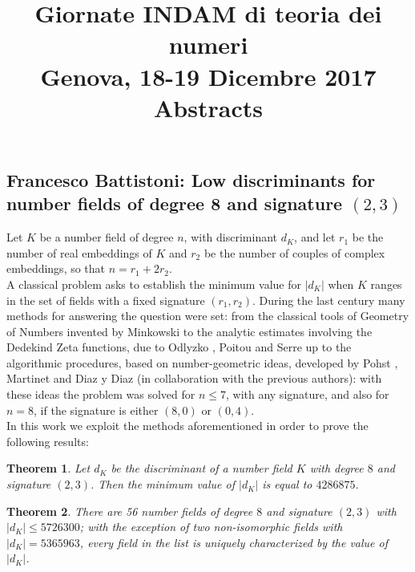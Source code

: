 \documentclass[15pt]{article}
\title{Giornate INDAM di teoria dei numeri\\ {\large Genova, 18-19 Dicembre 2017}\\[1em] Abstracts}
\author{}
\date{}
\newtheorem{thm}{Theorem}
\begin{document}
\maketitle
\thispagestyle{empty}

\vspace{-5em}

\subsection*{Francesco Battistoni: Low discriminants for number fields of degree 8 and signature $(2,3)$}
Let $K$ be a number field of degree $n$, with discriminant $d_K$, and let $r_1$ be the number of real embeddings of $K$ and $r_2$ be the number of couples of complex embeddings, so that $n=r_1+2r_2$.\\
A classical problem asks to establish the minimum value for $|d_K|$ when $K$ ranges in the set of fields with a fixed signature $(r_1,r_2)$. During the last century many methods for answering the question were set: from the classical tools of Geometry of Numbers invented by Minkowski to the analytic estimates involving the Dedekind Zeta functions, due to Odlyzko \cite{odlyzko1990bounds}, Poitou \cite{poitou1977petits} and Serre \cite{serre1986minorations} up to the algorithmic procedures, based on number-geometric ideas, developed by Pohst \cite{pohst1982computation}, Martinet \cite{martinet1985methodes} and Diaz y Diaz \cite{pohst1990minimum} (in collaboration with the previous authors): with these ideas the problem was solved for $n\leq 7$, with any signature, and also for $n=8$, if the signature is either $(8,0)$ or $(0,4)$.
\\
In this work we exploit the methods aforementioned in order to prove the following results:
\begin{thm}\label{minimumdisc}
	Let $d_K$ be the discriminant of a number field $K$ with degree $8$ and signature $(2,3)$. Then the minimum value of $|d_K|$ is equal to $4286875$.
\end{thm}

\begin{thm}\label{classification}
There are 56 number fields of degree $8$ and signature $(2,3)$ with $|d_K|\leq 5726300$; with the exception of two non-isomorphic fields with $|d_K|=5365963$, every field in the list is uniquely characterized by the value of $|d_K|$.
\end{thm}


{\small

}
\end{document}

